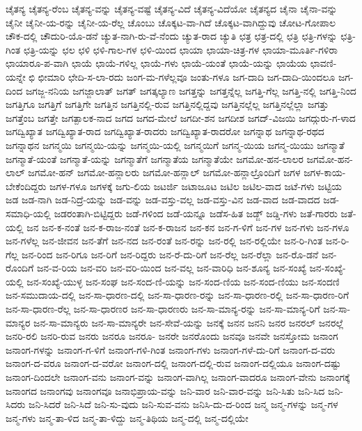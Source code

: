 {ಚೈತನ್ಯ
ಚೈತನ್ಯ-ರೆಂಬ
ಚೈತನ್ಯ-ವನ್ನು
ಚೈತನ್ಯ-ವಷ್ಟೆ
ಚೈತನ್ಯ-ವಿದೆ
ಚೈತನ್ಯ-ವಿದೆಯೋ
ಚೈತನ್ಯದ
ಚೈನಾ
ಚೈನಾ-ವನ್ನು
ಚೈನೀ
ಚೈನೀ-ಯ-ರನ್ನು
ಚೈನೀ-ಯ-ರೆಲ್ಲ
ಚೊಂಬು
ಚೊಕ್ಕಟ-ವಾ-ಗಿದೆ
ಚೊಕ್ಕಟ-ವಾಗಿದ್ದುವು
ಚೋಟ-ಗೋಪಾಲ
ಚೌಕ-ದಲ್ಲಿ
ಚೌದುರಿ-ಯೊ-ಡನೆ
ಚ್ಯುತ-ನಾಗಿ-ರು-ವೆ-ನೆಂದು
ಚ್ಯುತ-ರಾದ
ಚ್ಯುತಿ
ಛತ್ರ
ಛತ್ರ-ದಲ್ಲಿ
ಛತ್ರಿ
ಛತ್ರಿ-ಗಳನ್ನು
ಛತ್ರಿ-ಗಿಂತ
ಛತ್ರಿ-ಯನ್ನು
ಛಲ
ಛಳಿ
ಛಳಿ-ಗಾಲ-ಗಳ
ಛಳಿ-ಯಿಂದ
ಛಾಯಾ
ಛಾಯಾ-ಚಿತ್ರ-ಗಳ
ಛಾಯಾ-ಮೂರ್ತಿ-ಗಳಿರಾ
ಛಾಯಾರೂ-ಪ-ವಾಗಿ
ಛಾಯೆ
ಛಾಯೆ-ಗಳಿಲ್ಲ
ಛಾಯೆ-ಗಳು
ಛಾಯೆ-ಯಂತೆ
ಛಾಯೆ-ಯನ್ನು
ಛಾಯೆಯ
ಛಾವಣಿ-ಯನ್ನೇ
ಛಿ
ಛೀಮಾರಿ
ಛೇದಿ-ಸ-ಲಾ-ರದು
ಜಂಗ-ಮ-ಗಳೆಲ್ಲವೂ
ಜಂತು-ಗಳೂ
ಜಗ-ದಾದಿ
ಜಗ-ದಾದಿ-ಯಿಂದಲೂ
ಜಗ-ದಿಂದ
ಜಗಜ್ಜ-ನನಿಯ
ಜಗಜ್ಜಾಲಾತ್
ಜಗತ್
ಜಗತ್ಕಲ್ಯಾಣ
ಜಗತ್ತನ್ನು
ಜಗತ್ತನ್ನೆಲ್ಲ
ಜಗತ್ತಿ-ಗೆಲ್ಲ
ಜಗತ್ತಿ-ನಲ್ಲಿ
ಜಗತ್ತಿ-ನಿಂದ
ಜಗತ್ತಿಗೂ
ಜಗತ್ತಿಗೆ
ಜಗತ್ತಿಗೇ
ಜಗತ್ತಿನ
ಜಗತ್ತಿನಲ್ಲಿ-ರುವ
ಜಗತ್ತಿನಲ್ಲಿದ್ದವು
ಜಗತ್ತಿನಲ್ಲೆಲ್ಲ
ಜಗತ್ತಿನಲ್ಲೆಲ್ಲಾ
ಜಗತ್ತು
ಜಗತ್ತೆಂಬ
ಜಗತ್ತೇ
ಜಗತ್ಪಾಲಕ-ನಾದ
ಜಗದ
ಜಗದ-ಮೇಲೆ
ಜಗದೀ-ಶನ
ಜಗದೀಶ
ಜಗದ್-ವಿಜಯಿ
ಜಗದ್ಗುರು-ಗ-ಳಾದ
ಜಗದ್ವಿಖ್ಯಾತ
ಜಗದ್ವಿಖ್ಯಾತ-ರಾದ
ಜಗದ್ವಿಖ್ಯಾತ-ರಾದರು
ಜಗದ್ವಿಖ್ಯಾತ-ರಾದರೋ
ಜಗನ್ನಾಥ
ಜಗನ್ನಾಥ-ರಥದ
ಜಗನ್ನಾಥನ
ಜಗನ್ಮಯಿ
ಜಗನ್ಮಯಿ-ಯನ್ನು
ಜಗನ್ಮಯಿ-ಯಲ್ಲಿ
ಜಗನ್ಮಯಿಗೆ
ಜಗನ್ಮ-ಯಿಯ
ಜಗನ್ಮ-ಯಿಯು
ಜಗನ್ಮಾತೆ
ಜಗನ್ಮಾತೆ-ಯಂತೆ
ಜಗನ್ಮಾತೆ-ಯನ್ನು
ಜಗನ್ಮಾತೆಗೆ
ಜಗನ್ಮಾತೆಯ
ಜಗನ್ಮಾತೆಯೇ
ಜಗಮೋ-ಹನ-ಲಾಲರ
ಜಗಮೋ-ಹನ-ಲಾಲ್
ಜಗಮೋ-ಹನ್
ಜಗಮೋ-ಹನ್ಲಾಲರು
ಜಗಮೋ-ಹನ್ಲಾಲ್
ಜಗಮೋ-ಹನ್ಲಾಲ್ರೊಂದಿಗೆ
ಜಗಳ
ಜಗಳ-ಕಾಯ-ಬೇಕೆಂದಿದ್ದರು
ಜಗಳ-ಗಳೂ
ಜಗಳಕ್ಕೆ
ಜಗು-ಲಿಯ
ಜಟರ್ಜಿ
ಜಟಾಜೂಟ
ಜಟಿಲ
ಜಟಿಲ-ವಾದ
ಜಟೆ-ಗಳು
ಜಟ್ಟಿಯ
ಜಡ
ಜಡ-ನಾಗಿ
ಜಡ-ನಿದ್ರೆ-ಯನ್ನು
ಜಡ-ವನ್ನು
ಜಡ-ವಸ್ತು-ವಲ್ಲ
ಜಡ-ವಸ್ತು-ವಿನ
ಜಡ-ವಾದ
ಜಡ-ವಾದದ
ಜಡ-ಸಮಾಧಿ-ಯಲ್ಲಿ
ಜಡರಂತಾಗಿ-ಬಿಟ್ಟಿದ್ದರು
ಜಡೆ-ಗಳಿಂದ
ಜಡೆ-ಯನ್ನೂ
ಜಡೆಸ-ಹಿತ
ಜಡ್ಜ್
ಜಡ್ಡಿ-ಗಳು
ಜತೆ-ಗಾರರು
ಜತೆ-ಯಲ್ಲಿ
ಜನ
ಜನ-ಕ-ನಂತೆ
ಜನ-ಕ-ರಾಜ-ನಂತೆ
ಜನ-ಕ-ರಾಜನ
ಜನ-ಕನ
ಜನ-ಗ-ಳಿಗೆ
ಜನ-ಗಳ
ಜನ-ಗಳು
ಜನ-ಗಳೂ
ಜನ-ಗಳೆಲ್ಲ
ಜನ-ಜೀವನ
ಜನ-ತೆಗೆ
ಜನ-ನದ
ಜನ-ರಂತೆ
ಜನ-ರನ್ನು
ಜನ-ರಲ್ಲಿ
ಜನ-ರಲ್ಲಿಯೇ
ಜನ-ರಿ-ಗಿಂತ
ಜನ-ರಿ-ಗೆಲ್ಲ
ಜನ-ರಿಂದ
ಜನ-ರಿಗೂ
ಜನ-ರಿಗೆ
ಜನ-ರಿದ್ದರು
ಜನ-ರೆ-ದು-ರಿಗೆ
ಜನ-ರೆಲ್ಲ
ಜನ-ರೆಲ್ಲಾ
ಜನ-ರೊ-ಡನೆ
ಜನ-ರೊಂದಿಗೆ
ಜನ-ವ-ರಿಯ
ಜನ-ವರಿ
ಜನ-ವರಿ-ಯಿಂದ
ಜನ-ವಲ್ಲ
ಜನ-ವಾರಿಧಿ
ಜನ-ಶೂನ್ಯ
ಜನ-ಸಂಖ್ಯೆ
ಜನ-ಸಂಖ್ಯೆ-ಯಲ್ಲಿ
ಜನ-ಸಂಖ್ಯೆ-ಯುಳ್ಳ
ಜನ-ಸಂಘ
ಜನ-ಸಂದ-ಣಿ-ಯನ್ನು
ಜನ-ಸಂದ-ಣಿಯ
ಜನ-ಸಂದ-ಣಿಯು
ಜನ-ಸಂದಣಿ
ಜನ-ಸಮುದಾಯ-ದಲ್ಲಿ
ಜನ-ಸಾ-ಧಾರಣ-ದಲ್ಲಿ
ಜನ-ಸಾ-ಧಾರಣ-ರನ್ನು
ಜನ-ಸಾ-ಧಾರಣ-ರಲ್ಲಿ
ಜನ-ಸಾ-ಧಾರಣ-ರಿಗೆ
ಜನ-ಸಾ-ಧಾರಣ-ರೆಲ್ಲ
ಜನ-ಸಾ-ಧಾರಣರ
ಜನ-ಸಾ-ಧಾರಣರು
ಜನ-ಸಾ-ಮಾನ್ಯ-ರನ್ನು
ಜನ-ಸಾ-ಮಾನ್ಯ-ರಿಗೆ
ಜನ-ಸಾ-ಮಾನ್ಯರ
ಜನ-ಸಾ-ಮಾನ್ಯರು
ಜನ-ಸಾ-ಮಾನ್ಯರೇ
ಜನ-ಸೇವೆ-ಯನ್ನು
ಜನಕ್ಕೆ
ಜನನ
ಜನನಿ
ಜನರ
ಜನರಲ್
ಜನರಲ್ಲೆ
ಜನರಿ-ರಲಿ
ಜನರಿ-ರುವ
ಜನರು
ಜನರೂ
ಜನರೂ-
ಜನರೇ
ಜನರೊಂದು
ಜನವೂ
ಜನವೇ
ಜನಸ್ತೋಮ
ಜನಾಂಗ
ಜನಾಂಗ-ಗಳನ್ನು
ಜನಾಂಗ-ಗ-ಳಿಗೆ
ಜನಾಂಗ-ಗಳಿ-ಗಿಂತ
ಜನಾಂಗ-ಗಳು
ಜನಾಂಗ-ಗಳೆ-ದು-ರಿಗೆ
ಜನಾಂಗ-ದ-ವರು
ಜನಾಂಗ-ದ-ವರೂ
ಜನಾಂಗ-ದ-ವರೋ
ಜನಾಂಗ-ದಲ್ಲಿ
ಜನಾಂಗ-ದಲ್ಲಿ-ರುವ
ಜನಾಂಗ-ದಲ್ಲಿಯೂ
ಜನಾಂಗ-ದಷ್ಟು
ಜನಾಂಗ-ದಿಂದಲೇ
ಜನಾಂಗ-ವನು
ಜನಾಂಗ-ವನ್ನು
ಜನಾಂಗ-ವಾಗಿಲ್ಲ
ಜನಾಂಗ-ವಾದರೂ
ಜನಾಂಗ-ವೇನು
ಜನಾಂಗಕ್ಕೆ
ಜನಾಂಗದ
ಜನಾಂಗವು
ಜನಾಂಗವೂ
ಜನಾಭಿಪ್ರಾಯ-ವನ್ನು
ಜನಿ-ವಾರ
ಜನಿ-ವಾರ-ವನ್ನು
ಜನಿ-ಸಿತು
ಜನಿ-ಸಿದ
ಜನಿ-ಸಿದರು
ಜನಿ-ಸಿದರೆ
ಜನಿ-ಸಿದೆ
ಜನಿ-ಸು-ವುದು
ಜನಿ-ಸುವ-ವನು
ಜನಿಸಿ-ದು-ದ-ರಿಂದ
ಜನ್ಮ
ಜನ್ಮ-ಗಳನ್ನು
ಜನ್ಮ-ಗಳ
ಜನ್ಮ-ಗಳು
ಜನ್ಮ-ತಾ-ಳಿದ
ಜನ್ಮ-ತಾ-ಳಿದ್ದು
ಜನ್ಮ-ತಿಥಿಯ
ಜನ್ಮ-ದಲ್ಲಿ
ಜನ್ಮ-ದಲ್ಲಿಯೇ
}
